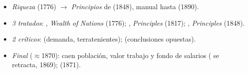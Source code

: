 \documentclass{article}
\begin{document}
\begin{columnas}
\begin{itemize}
\item \emph{Riqueza} (1776) $\to$ \emph{Principios} de  (1848), manual hasta  (1890).
\item \emph{3 tratados}: , \emph{Wealth of Nations} (1776); , \emph{Principles} (1817); , \emph{Principles} (1848).
\item \emph{2 críticos}:  (demanda, terratenientes);  (conclusiones opuestas).
\item \emph{Final} ($\approx$1870): caen población, valor trabajo y fondo de salarios ( se retracta, 1869);  (1871).
\end{itemize}


\end{columnas}
\end{document}
